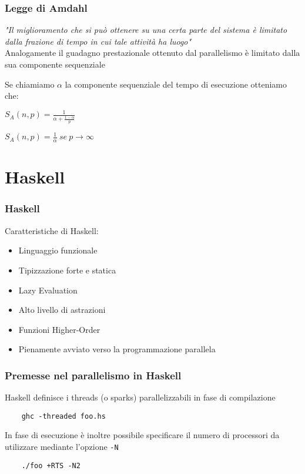 \documentclass[14pt]{beamer}
\begin{document}

\begin{frame}
\frametitle{Legge di Amdahl}
\textit{"Il miglioramento che si può ottenere su una certa parte del sistema è limitato dalla frazione di tempo in cui tale attività ha luogo"}\\[2ex]
Analogamente il guadagno prestazionale ottenuto dal parallelismo è limitato dalla sua componente sequenziale
\end{frame}


\begin{frame}
Se chiamiamo $\alpha$ la componente sequenziale del tempo di esecuzione otteniamo che:
\begin{center}
$\displaystyle S_{A}(n,p) = \frac{1}{\displaystyle \alpha + \frac{1-\alpha}{p}}$\\[2ex]
\end{center}

\begin{center}
$\displaystyle S_A(n,p) = \frac{1}{\alpha} \ se \ p \rightarrow \infty$
\end{center}

\end{frame}

\section{Haskell}
\begin{frame}
\frametitle{Haskell}
Caratteristiche di Haskell:
\begin{itemize}
\item Linguaggio funzionale
\item Tipizzazione forte e statica
\item Lazy Evaluation
\item Alto livello di astrazioni
\item Funzioni Higher-Order
\item Pienamente avviato verso la programmazione parallela
\end{itemize}
\end{frame}


\begin{frame}[fragile]
\frametitle{Premesse nel parallelismo in Haskell}
Haskell definisce i threads (o sparks) parallelizzabili in fase di compilazione
\begin{verbatim}
    ghc -threaded foo.hs
\end{verbatim}
In fase di esecuzione è inoltre possibile specificare il numero di processori da utilizzare mediante l'opzione \texttt{-N}
\begin{verbatim}
    ./foo +RTS -N2
\end{verbatim}
\end{frame}
\end{document}
